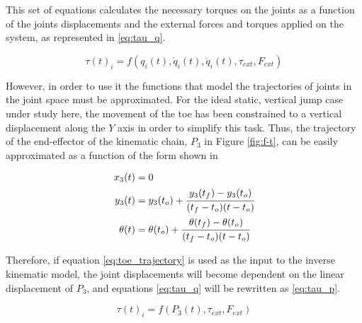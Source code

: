 This set of equations calculates the necessary torques on the joints as a function of the joints displacements and the external forces and torques applied on the system, as represented in \ref{eq:tau_q}.

\begin{equation}
\label{eq:tau_q}
	\tau(t)_{i} = f(q_{i}(t), \dot{q}_{i}(t), \ddot{q}_{i}(t), \tau_{ext}, F_{ext})
\end{equation}

However, in order to use it the functions that model the trajectories of joints in the joint space must be approximated.
For the ideal static, vertical jump case under study here, the movement of the toe has been constrained to a vertical displacement along the $Y$ axis in order to simplify this task.
Thus, the trajectory of the end-effector of the kinematic chain, $P_{3}$ in Figure \ref{fig:f-t}, can be easily approximated as a function of the form shown in 

\begin{equation}
\label{eq:toe_trajectory}
	\begin{aligned}
	x_{3}(t) &= 0 \\
	y_{3}(t) &= y_{3}(t_{o}) + \cfrac{y_{3}(t_{f}) - y_{3}(t_{o})}{(t_{f} - t_{o}) (t - t_{o})} \\
    \theta(t) &= \theta(t_{o}) + \cfrac{\theta(t_{f}) - \theta(t_{o})}{(t_{f} - t_{o}) (t - t_{o})} 
    \end{aligned}
\end{equation}

Therefore, if equation \ref{eq:toe_trajectory} is used as the input to the inverse kinematic model, the joint displacements will become dependent on the linear displacement of $P_{3}$, and equations \ref{eq:tau_q} will be rewritten as \ref{eq:tau_p}.

\begin{equation}
\label{eq:tau_p}
	\tau(t)_{i} = f(P_{3}(t), \tau_{ext}, F_{ext})
\end{equation}





